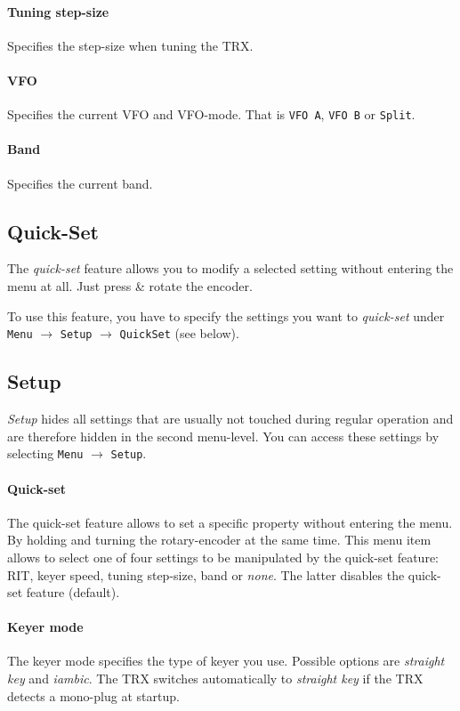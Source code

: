 \documentclass[10pt, a4paper,twoside]{scrartcl}
\begin{document}
\paragraph{Tuning step-size}
Specifies the step-size when tuning the TRX.

\paragraph{VFO}
Specifies the current VFO and VFO-mode. That is \texttt{VFO A}, \texttt{VFO B} or \texttt{Split}.

\paragraph{Band}
Specifies the current band. 


\subsection{Quick-Set}
The \emph{quick-set} feature allows you to modify a selected setting without entering the menu at all. Just press \& rotate the  encoder.

To use this feature, you have to specify the settings you want to \emph{quick-set} under \texttt{Menu} $\rightarrow$ \texttt{Setup} $\rightarrow$ \texttt{QuickSet} (see below).

\subsection{Setup}
\emph{Setup} hides all settings that are usually not touched during regular operation and are therefore hidden in the second menu-level. You can access these settings by selecting \texttt{Menu} $\rightarrow$ \texttt{Setup}.

\paragraph{Quick-set}
The quick-set feature allows to set a specific property without entering the menu. By holding and turning the rotary-encoder at the same time. This menu item allows to select one of four settings to be manipulated by the quick-set feature: RIT, keyer speed, tuning step-size, band or \emph{none}. The latter disables the quick-set feature (default).

\paragraph{Keyer mode}
The keyer mode specifies the type of keyer you use. Possible options are \emph{straight key} and \emph{iambic}. The TRX switches automatically to \emph{straight key} if the TRX detects a mono-plug at startup.
\end{document}
